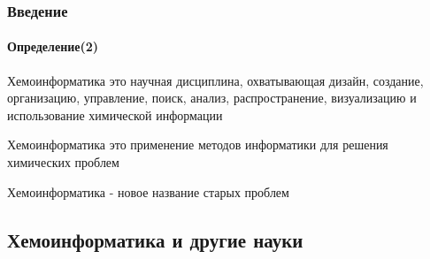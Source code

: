 \begin{frame}
  \frametitle{Введение}
  \framesubtitle{Определение(2)}

  \begin{defn}
    Хемоинформатика это научная дисциплина, охватывающая дизайн, создание, организацию, управление, поиск, 
    анализ, распространение, визуализацию и использование химической информации
  \end{defn}

  \begin{defn}[И.Гастайгер]
    Хемоинформатика это применение методов информатики для решения химических проблем
  \end{defn}

  \begin{defn}[Р.Грин]
    Хемоинформатика - новое название старых проблем
  \end{defn}
 
\end{frame}

\subsection{Хемоинформатика и другие науки}

